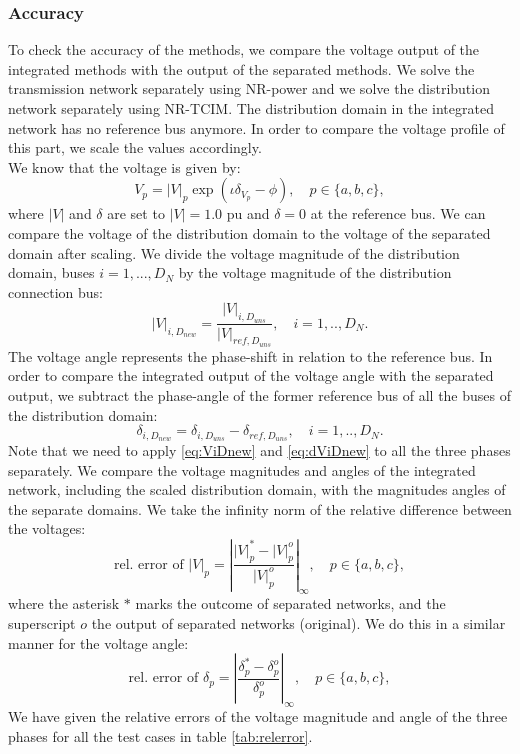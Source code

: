 \documentclass[10pt,journal]{article}
\begin{document}
\subsubsection{Accuracy} 
To check the accuracy of the methods, we compare the voltage output of the integrated methods with the output of the separated methods. We solve the transmission network separately using NR-power and we solve the distribution network separately using NR-TCIM. The distribution domain in the integrated network has no reference bus anymore. In order to compare the voltage profile of this part, we scale the values accordingly. \\
We know that the voltage is given by: \begin{equation}
V_p=|V|_p\exp{(\iota\delta_{V_p}-\phi)},\quad p\in\{a,b,c\},
\end{equation}
where $|V|$ and $\delta$ are set to $|V|=1.0$ pu and $\delta=0$ at the reference bus. We can compare the voltage of the distribution domain to the voltage of the separated domain after scaling. We divide the voltage magnitude of the distribution domain, buses $i=1,...,D_N$ by the voltage magnitude of the distribution connection bus: 
\begin{equation}
|V|_{i,{D_{new}}} = \frac{|V|_{i,{D_{uns}}}}{|V|_{ref,{D_{uns}}}},\quad i=1,..,D_N.
\label{eq:ViDnew}
\end{equation}
The voltage angle represents the phase-shift in relation to the reference bus. In order to compare the integrated output of the voltage angle with the separated output, we subtract the phase-angle of the former reference bus of all the buses of the distribution domain: 
\begin{equation}
\delta_{i,{D_{new}}} ={\delta_{i,{D_{uns}}}}-{\delta_{ref,{D_{uns}}}},\quad i=1,..,D_N.
\label{eq:dViDnew}
\end{equation}
Note that we need to apply \eqref{eq:ViDnew} and \eqref{eq:dViDnew} to all the three phases separately. \newline\newline
We compare the voltage magnitudes and angles of the integrated network, including the scaled distribution domain, with the magnitudes angles of the separate domains. We take the infinity norm of the relative difference between the voltages: 
\begin{equation}
\mbox{rel. error of } |V|_p = \left|\frac{|V|^*_p - |V|^o_p}{|V|^o_p}\right|_\infty,\quad p\in\{a,b,c\},
\label{eq:norm|V|}
\end{equation}
where the asterisk $*$ marks the outcome of separated networks, and the superscript $o$ the output of separated networks (original). We do this in a similar manner for the voltage angle: 
\begin{equation}
\mbox{rel. error of } \delta_p = \left|\frac{\delta^*_p - \delta^o_p}{\delta^o_p}\right|_\infty,\quad p\in\{a,b,c\},
\label{eq:normdelta}
\end{equation}
We have given the relative errors of the voltage magnitude and angle of the three phases for all the test cases in table \ref{tab:relerror}. 
\end{document}
